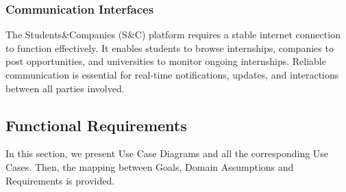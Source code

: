 \subsubsection{Communication Interfaces}

The Students\&Companies (S\&C) platform requires a stable internet connection to function effectively. It enables students to browse internships, companies to post opportunities, and universities to monitor ongoing internships. Reliable communication is essential for real-time notifications, updates, and interactions between all parties involved.

\subsection{Functional Requirements}
In this section, we present Use Case Diagrams and all the corresponding Use Cases. Then, the mapping between Goals, Domain Assumptions and Requirements is provided.



